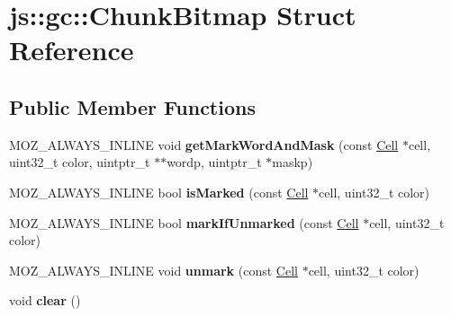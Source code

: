 \hypertarget{structjs_1_1gc_1_1_chunk_bitmap}{\section{js\-:\-:gc\-:\-:Chunk\-Bitmap Struct Reference}
\label{structjs_1_1gc_1_1_chunk_bitmap}
}
\subsection*{Public Member Functions}
\begin{DoxyCompactItemize}
\item 
\hypertarget{structjs_1_1gc_1_1_chunk_bitmap_abb047e55dc105dd7dd8d37cbf474d58e}{M\-O\-Z\-\_\-\-A\-L\-W\-A\-Y\-S\-\_\-\-I\-N\-L\-I\-N\-E void {\bfseries get\-Mark\-Word\-And\-Mask} (const \hyperlink{structjs_1_1gc_1_1_cell}{Cell} $\ast$cell, uint32\-\_\-t color, uintptr\-\_\-t $\ast$$\ast$wordp, uintptr\-\_\-t $\ast$maskp)}\label{structjs_1_1gc_1_1_chunk_bitmap_abb047e55dc105dd7dd8d37cbf474d58e}

\item 
\hypertarget{structjs_1_1gc_1_1_chunk_bitmap_ab5a23317938c325c7c59e111ce2e60f7}{M\-O\-Z\-\_\-\-A\-L\-W\-A\-Y\-S\-\_\-\-I\-N\-L\-I\-N\-E bool {\bfseries is\-Marked} (const \hyperlink{structjs_1_1gc_1_1_cell}{Cell} $\ast$cell, uint32\-\_\-t color)}\label{structjs_1_1gc_1_1_chunk_bitmap_ab5a23317938c325c7c59e111ce2e60f7}

\item 
\hypertarget{structjs_1_1gc_1_1_chunk_bitmap_a2b2bbf13bb8ad1a35e5c9143c04bd125}{M\-O\-Z\-\_\-\-A\-L\-W\-A\-Y\-S\-\_\-\-I\-N\-L\-I\-N\-E bool {\bfseries mark\-If\-Unmarked} (const \hyperlink{structjs_1_1gc_1_1_cell}{Cell} $\ast$cell, uint32\-\_\-t color)}\label{structjs_1_1gc_1_1_chunk_bitmap_a2b2bbf13bb8ad1a35e5c9143c04bd125}

\item 
\hypertarget{structjs_1_1gc_1_1_chunk_bitmap_a33296aa529d653d353b6018509e9a01b}{M\-O\-Z\-\_\-\-A\-L\-W\-A\-Y\-S\-\_\-\-I\-N\-L\-I\-N\-E void {\bfseries unmark} (const \hyperlink{structjs_1_1gc_1_1_cell}{Cell} $\ast$cell, uint32\-\_\-t color)}\label{structjs_1_1gc_1_1_chunk_bitmap_a33296aa529d653d353b6018509e9a01b}

\item 
\hypertarget{structjs_1_1gc_1_1_chunk_bitmap_a609815773069ba57f6a004b16feb1e94}{void {\bfseries clear} ()}\label{structjs_1_1gc_1_1_chunk_bitmap_a609815773069ba57f6a004b16feb1e94}


\end{DoxyCompactItemize}
